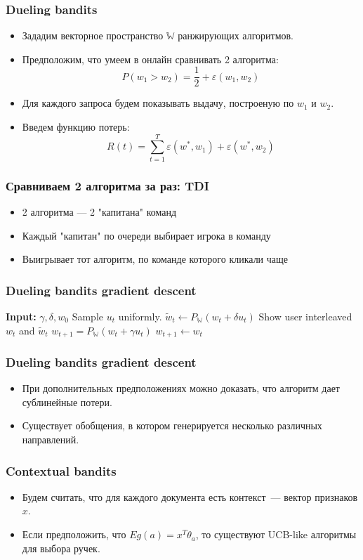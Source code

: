 \documentclass[xetex,mathserif,serif,table]{beamer}
\begin{document}
\begin{frame}
\frametitle{Dueling bandits}

\begin{itemize}
  \item Зададим векторное пространство $\mathbb{W}$ ранжирующих алгоритмов.
  \item Предположим, что умеем в онлайн сравнивать 2 алгоритма:
  $$P(w_1 > w_2) = \frac{1}{2} + \varepsilon(w_1, w_2)$$
  \item Для каждого запроса будем показывать выдачу, построеную по $w_1$ и $w_2$.
  \item Введем функцию потерь:
  $$ R(t) = \sum\limits_{t=1}^{T} \varepsilon(w^{*}, w_1) + \varepsilon(w^{*}, w_2)$$
\end{itemize}
\end{frame}

\begin{frame}
\frametitle{Сравниваем 2 алгоритма за раз: TDI}
\begin{itemize}
  \item 2 алгоритма — 2 "капитана" команд
  \item Каждый "капитан" по очереди выбирает игрока в команду
  \item Выигрывает тот алгоритм, по команде которого кликали чаще
\end{itemize} 
\end{frame}


\begin{frame}
\frametitle{Dueling bandits gradient descent}

\begin{algorithmic}
\State \textbf{Input: } $\gamma, \delta, w_0$
  \State Sample $u_t$ uniformly.
  \State $\tilde{w}_t \gets P_{\mathbb{W}} (w_t + \delta u_t)$ 
  \State Show user interleaved $w_t$ and $\tilde{w}_t$ 
    \State $w_{t+1} = P_{\mathbb{W}} (w_t + \gamma u_t)$
  \Else
    \State $w_{t+1} \gets w_{t}$
  \EndIf
\EndFor 
\end{algorithmic}
\end{frame}

\begin{frame}
\frametitle{Dueling bandits gradient descent}
\begin{itemize}
\item При дополнительных предположениях можно доказать, что алгоритм дает сублинейные потери. 
\item Существует обобщения, в котором генерируется несколько различных направлений.
\end{itemize}
\end{frame}

\begin{frame}
\frametitle{Contextual bandits}
\begin{itemize} 
\item Будем считать, что для каждого документа есть контекст — вектор признаков  $x$.
\item Если предположить, что $Eg(a) = x^{T} \theta_{a}$, то существуют UCB-like алгоритмы для выбора ручек.

\end{itemize}
\end{frame}





\end{document}
